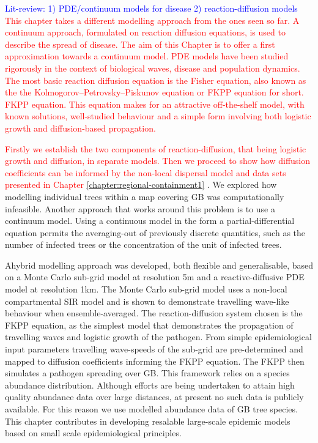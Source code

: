 \textcolor{blue}{Lit-review: 1) PDE/continuum models for disease 2) reaction-diffusion models}
\textcolor{red}{This chapter takes a different modelling approach from the ones seen so far. %
A continuum approach, formulated on reaction diffusion equations, is used to describe the spread of disease. %
The aim of this Chapter is to offer a first approximation towards a continuum model. %
PDE models have been  studied rigorously in the context of biological waves, disease and population dynamics. %
The most basic reaction diffusion equation is the Fisher equation, also known as the the Kolmogorov–Petrovsky–Piskunov equation or FKPP equation for short. %
FKPP equation. This equation makes for an attractive off-the-shelf model, with known solutions, well-studied behaviour and a simple form involving both logistic growth and diffusion-based propagation.}                                                


\textcolor{red}{Firstly we establish the two components of reaction-diffusion, that being logistic growth and diffusion, in separate models. Then we proceed to show how diffusion coefficients can be informed by the non-local dispersal model and data sets presented in Chapter \ref{chapter:regional-containment1} }. We explored how modelling individual trees within a map covering GB  was computationally infeasible. Another approach that works around this problem is to use a continuum model. Using a continuous model in the form a partial-differential equation permits the averaging-out of previously discrete quantities, such as the number of infected trees or the concentration of the unit of infected  trees.

 Ahybrid modelling approach was developed, both flexible and generalisable, based on a Monte Carlo sub-grid model at resolution 5m and a reactive-diffusive PDE model at resolution 1km. %
 The Monte Carlo sub-grid model uses a non-local compartmental SIR model and is shown to demonstrate travelling wave-like behaviour when ensemble-averaged. %
 The reaction-diffusion system chosen is the FKPP equation, as the simplest model that  demonstrates the propagation of travelling waves and logistic growth of the pathogen. From simple epidemiological input parameters travelling wave-speeds of the sub-grid are pre-determined and mapped to diffusion coefficients informing the FKPP equation. %
 The FKPP then simulates a pathogen spreading over GB. This framework relies on a species abundance distribution. %
 Although efforts are being undertaken to attain high quality abundance data over large distances, at present no such data is publicly available. %
 For this reason we use modelled abundance data of GB tree species. This chapter contributes in  developing resalable large-scale epidemic models based on small scale epidemiological principles. %

